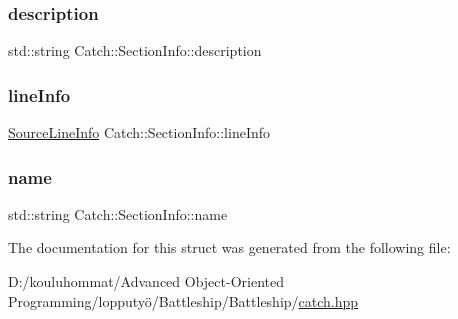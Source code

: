 \subsubsection{\texorpdfstring{description}{description}}
{\footnotesize\ttfamily std\+::string Catch\+::\+Section\+Info\+::description}

\mbox{\label{struct_catch_1_1_section_info_adbc83b8a3507c4acc8ee249e93465711}} 
\subsubsection{\texorpdfstring{line\+Info}{lineInfo}}
{\footnotesize\ttfamily \mbox{\hyperlink{struct_catch_1_1_source_line_info}{Source\+Line\+Info}} Catch\+::\+Section\+Info\+::line\+Info}

\mbox{\label{struct_catch_1_1_section_info_a704c8fc662d309137e0d4f199cb7df58}} 
\subsubsection{\texorpdfstring{name}{name}}
{\footnotesize\ttfamily std\+::string Catch\+::\+Section\+Info\+::name}



The documentation for this struct was generated from the following file\+:\begin{DoxyCompactItemize}
\item 
D\+:/kouluhommat/\+Advanced Object-\/\+Oriented Programming/lopputyö/\+Battleship/\+Battleship/\mbox{\hyperlink{catch_8hpp}{catch.\+hpp}}\end{DoxyCompactItemize}
